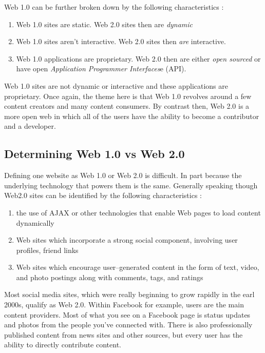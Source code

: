 \documentclass[12pt]{article}
\begin{document}
Web 1.0 can be further broken down by the following characteristics \cite{is_there_web_1}:

\begin{enumerate}
  \item {Web 1.0 sites are static.  Web 2.0 sites then are \textit{dynamic}}
  \item {Web 1.0 sites aren't interactive. Web 2.0 sites then \textit{are} interactive.}
  \item {Web 1.0 applications are proprietary.  Web 2.0 then are either \textit{open sourced} or have open \textit{Application Programmer Interfaces}e (API).}
\end{enumerate}

Web 1.0 sites are not dynamic or interactive and these applications are proprietary.  Once again, the theme here is that Web 1.0 revolves around a few content creators and many content consumers.  By contrast then, Web 2.0 is a more open web in which all of the users have the ability to become a contributor and a developer.

\subsection{Determining Web 1.0 vs Web 2.0}
Defining one website as Web 1.0 or Web 2.0 is difficult.  In part because the underlying technology that powers them is the same.  Generally speaking though Web2.0 sites can be identified by the following characteristics \cite{FM2125}:
\begin{enumerate}
  \item{the use of AJAX or other technologies that enable Web pages to load content dynamically}
  \item{Web sites which incorporate a strong social component, involving user profiles, friend links}
  \item{Web sites which encourage user–generated content in the form of text, video, and photo postings along with comments, tags, and ratings}
\end{enumerate}

Most social media sites, which were really beginning to grow rapidly in the earl 2000s, qualify as Web 2.0.  Within Facebook for example, users are the main content providers.  Most of what you see on a Facebook page is status updates and photos from the people you've connected with.  There is also professionally published content from news sites and other sources, but every user has the ability to directly contribute content.
\end{document}

